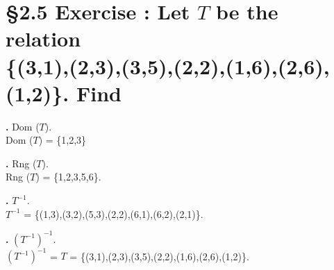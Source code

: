 \documentclass[a4paper,11pt]{article}
\begin{document}
\setcounter{ProblemCounter}{1}
\section*{\S 2.5 Exercise : Let \(T\) be the relation\\ \{{(3,1)},{(2,3)},{(3,5)},{(2,2)},{(1,6)},{(2,6)},{(1,2)}\}. Find}
\setcounter{SubsectionCounter}{1}
\textbf{.}
Dom {(\(T\))}.\\
Dom {(\(T\))} = \{1,2,3\}\\
\addtocounter{SubsectionCounter}{1}
\textbf{.}
Rng {(\(T\))}.\\
Rng {(\(T\))} = \{1,2,3,5,6\}.\\
\addtocounter{SubsectionCounter}{1}
\textbf{.}
\(T^{-1}\).\\
\(T^{-1}\) = \{{(1,3)},{(3,2)},{(5,3)},{(2,2)},{(6,1)},{(6,2)},{(2,1)}\}.\\
\addtocounter{SubsectionCounter}{1}
\textbf{.}
\({(T^{-1})}^{-1}\).\\
\({(T^{-1})}^{-1}\) = \(T\) = \{{(3,1)},{(2,3)},{(3,5)},{(2,2)},{(1,6)},{(2,6)},{(1,2)}\}.\\
\newpage

\setcounter{ProblemCounter}{7}
\end{document}
